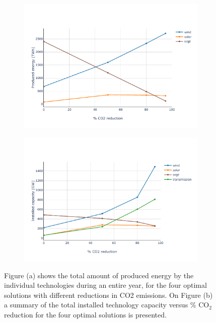 \begin{figure}[h]\centering
	\begin{subfigure}{1\textwidth}
		\includegraphics[width=.9\textwidth,trim={0 0cm 0cm 2.8cm},clip]{./Images/optimal_solutions_summary_production}
		\caption{}
		\label{fig:Optimal_Solutions_produc}
	\end{subfigure}%
	\vspace{-10pt}
	\begin{subfigure}{1\textwidth}
		\includegraphics[width=1\textwidth,trim={0 0cm 0cm 2.8cm},clip]{./Images/optimal_solutions_summary}
		\caption{}
		\label{fig:Optimal_Solutions_summary}
	\end{subfigure}%
	\caption{Figure (a) shows the total amount of produced energy by the individual technologies during an entire year, for the four optimal solutions with different reductions in CO2 emissions. On Figure (b) a summary of the total installed technology capacity versus \% $\text{CO}_2$ reduction for the four optimal solutions is presented.}
	\label{fig:Optimal_Solutions_summary_both}
\end{figure}

